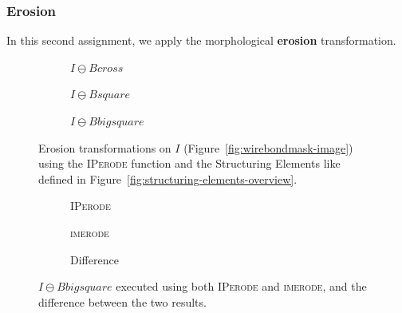 \documentclass{article}
\begin{document}
\subsubsection*{Erosion} In this second assignment, we apply the morphological \textbf{erosion} transformation. 

\begin{figure}[H]
     \centering
     \begin{subfigure}[b]{0.3\textwidth}
         \centering
         
         \caption{$I \ominus Bcross$}
         \label{fig:wirebondmask_Bcross_eroded}
     \end{subfigure}
     \hfill
     \begin{subfigure}[b]{0.3\textwidth}
         \centering
         
         \caption{$I \ominus Bsquare$}
         \label{fig:wirebondmask_Bsquare_eroded}
     \end{subfigure}
     \hfill
     \begin{subfigure}[b]{0.3\textwidth}
         \centering
         
         \caption{$I \ominus Bbigsquare$}
         \label{fig:wirebondmask_Bbigsquare_eroded}
     \end{subfigure}
     
    \caption{Erosion transformations on $I$ (Figure~\ref{fig:wirebondmask-image}) using the \textsc{IPerode} function and the Structuring Elements like defined in Figure~\ref{fig:structuring-elements-overview}.}
    \label{fig:wirebondmask_eroded}
\end{figure}

\begin{figure}[H]
     \centering
     \begin{subfigure}[b]{0.3\textwidth}
         \centering
         
         \caption{\textsc{IPerode}}
         \label{fig:wirebondmask_Bbigsquare_IPerode}
     \end{subfigure}
     \hfill
     \begin{subfigure}[b]{0.3\textwidth}
         \centering
         
         \caption{\textsc{imerode}}
         \label{fig:wirebondmask_Bbigsquare_imerode}
     \end{subfigure}
     \hfill
     \begin{subfigure}[b]{0.3\textwidth}
         \centering
         
         \caption{Difference}
         \label{fig:wirebondmask_Bbigsquare_erode_diff}
     \end{subfigure}
     
    \caption{$I \ominus Bbigsquare$ executed using both \textsc{IPerode} and \textsc{imerode}, and the difference between the two results.}
    \label{fig:wirebondmask_erode_diff}
\end{figure}
\end{document}
